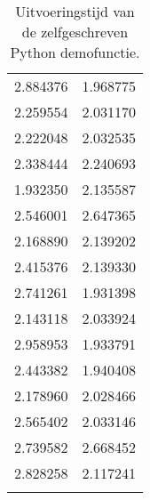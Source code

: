 \begin{longtable}[c]{ll}
    2.884376 & 1.968775 \\
    2.259554 & 2.031170 \\
    2.222048 & 2.032535 \\
    2.338444 & 2.240693 \\
    1.932350 & 2.135587 \\
    2.546001 & 2.647365 \\
    2.168890 & 2.139202 \\
    2.415376 & 2.139330 \\
    2.741261 & 1.931398 \\
    2.143118 & 2.033924 \\
    2.958953 & 1.933791 \\
    2.443382 & 1.940408 \\
    2.178960 & 2.028466 \\
    2.565402 & 2.033146 \\
    2.739582 & 2.668452 \\
    2.828258 & 2.117241 \\
    \caption{Uitvoeringstijd van de zelfgeschreven Python demofunctie.}
     \label{tab:uitvoeringstijd-demofunctie}\\
\end{longtable}

